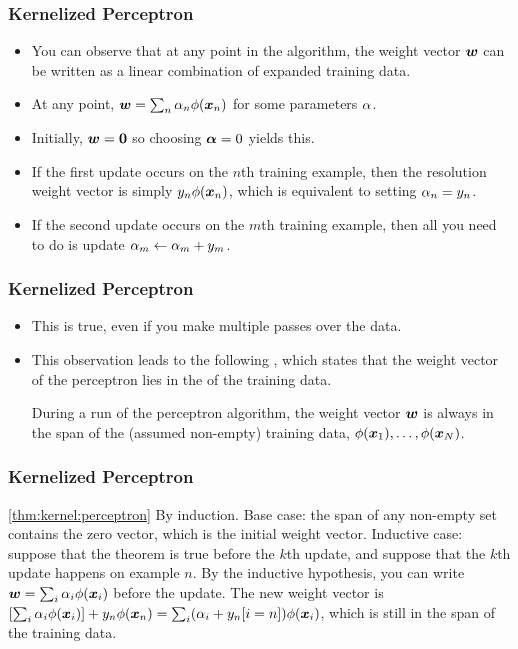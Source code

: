 \documentclass[trans]{beamer}
\begin{document}
\begin{frame}
  \frametitle{Kernelized Perceptron}
\begin{itemize}
\item 
You can observe that at any point in the algorithm, the
weight vector ${\boldsymbol{w}}$ can be written as a linear combination of expanded
training data.
\item At any point, ${\boldsymbol{w}} = \sum_n \alpha_n
\phi({\boldsymbol{x}}_n)$ for some parameters $\alpha$. 
\item Initially, ${\boldsymbol{w}} = \boldsymbol{0}$ so
choosing $\boldsymbol{\alpha} = 0$ yields this.  
\item If the first update occurs on the
$n$th training example, then the resolution weight vector is simply
$y_n \phi({\boldsymbol{x}}_n)$, which is equivalent to setting $\alpha_n = y_n$.
\item  If
the second update occurs on the $m$th training example, then all you
need to do is update $\alpha_m \leftarrow \alpha_m + y_m$.  
\end{itemize}
\end{frame}
\begin{frame}
  \frametitle{Kernelized Perceptron}
\begin{itemize}
\item 
This is true,
even if you make multiple passes over the data.  
\item This observation
leads to the following , which states
that the weight vector of the perceptron lies in the  of
the training data.
\begin{theorem} \label{thm:kernel:perceptron}
  During a run of the perceptron algorithm, the weight vector ${\boldsymbol{w}}$ is
  always in the span of the (assumed non-empty) training data,
  $\phi({\boldsymbol{x}}_1), \dots, \phi({\boldsymbol{x}}_N)$.
\end{theorem}
\end{itemize}
\end{frame}
\begin{frame}
  \frametitle{Kernelized Perceptron}
\begin{myproof}{\ref{thm:kernel:perceptron}}
  By induction.  Base case: the span of any non-empty set contains the
  zero vector, which is the initial weight vector.  Inductive case:
  suppose that the theorem is true before the $k$th update, and
  suppose that the $k$th update happens on example $n$.  By the
  inductive hypothesis, you can write ${\boldsymbol{w}} = \sum_i \alpha_i \phi({\boldsymbol{x}}_i)$
  before the update.  The new weight vector is $\left[ \sum_i \alpha_i
    \phi({\boldsymbol{x}}_i) \right] + y_n \phi({\boldsymbol{x}}_n) = \sum_i (\alpha_i + y_n[i=n])
  \phi({\boldsymbol{x}}_i)$, which is still in the span of the training data.
\end{myproof}
\end{frame}
\end{document}

